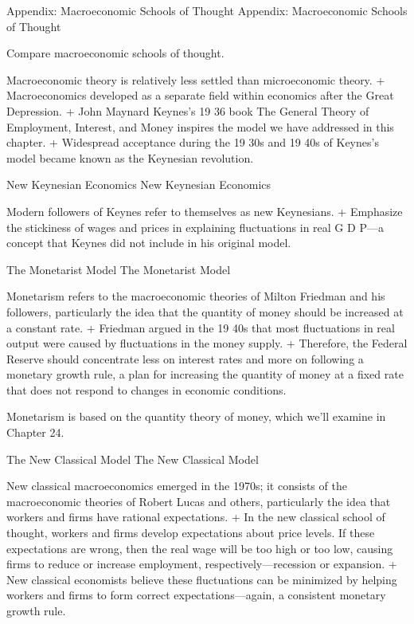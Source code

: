 \documentclass[
  12pt,
  ignorenonframetext,
]{beamer}
\begin{document}
\begin{frame}{Appendix: Macroeconomic Schools of Thought}
\protect\hypertarget{appendix-macroeconomic-schools-of-thought}{}
Appendix: Macroeconomic Schools of Thought

Compare macroeconomic schools of thought.

Macroeconomic theory is relatively less settled than microeconomic
theory. + Macroeconomics developed as a separate field within economics
after the Great Depression. + John Maynard Keynes's 19 36 book The
General Theory of Employment, Interest, and Money inspires the model we
have addressed in this chapter. + Widespread acceptance during the 19
30s and 19 40s of Keynes's model became known as the Keynesian
revolution.
\end{frame}

\begin{frame}{New Keynesian Economics}
\protect\hypertarget{new-keynesian-economics}{}
New Keynesian Economics

Modern followers of Keynes refer to themselves as new Keynesians. +
Emphasize the stickiness of wages and prices in explaining fluctuations
in real G D P---a concept that Keynes did not include in his original
model.
\end{frame}

\begin{frame}{The Monetarist Model}
\protect\hypertarget{the-monetarist-model}{}
The Monetarist Model

Monetarism refers to the macroeconomic theories of Milton Friedman and
his followers, particularly the idea that the quantity of money should
be increased at a constant rate. + Friedman argued in the 19 40s that
most fluctuations in real output were caused by fluctuations in the
money supply. + Therefore, the Federal Reserve should concentrate less
on interest rates and more on following a monetary growth rule, a plan
for increasing the quantity of money at a fixed rate that does not
respond to changes in economic conditions.

Monetarism is based on the quantity theory of money, which we'll examine
in Chapter 24.
\end{frame}

\begin{frame}{The New Classical Model}
\protect\hypertarget{the-new-classical-model}{}
The New Classical Model

New classical macroeconomics emerged in the 1970s; it consists of the
macroeconomic theories of Robert Lucas and others, particularly the idea
that workers and firms have rational expectations. + In the new
classical school of thought, workers and firms develop expectations
about price levels. If these expectations are wrong, then the real wage
will be too high or too low, causing firms to reduce or increase
employment, respectively---recession or expansion. + New classical
economists believe these fluctuations can be minimized by helping
workers and firms to form correct expectations---again, a consistent
monetary growth rule.
\end{frame}
\end{document}
